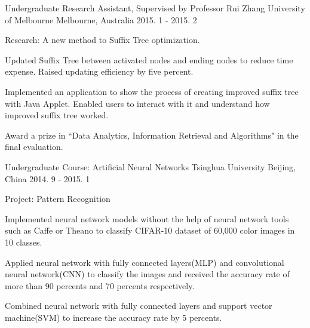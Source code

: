 \begin{cventries}
  \cventry
    {Undergraduate Research Assistant, Supervised by Professor Rui Zhang}
    {University of Melbourne}
    {Melbourne, Australia}
    {2015. 1 - 2015. 2}
    {
      \begin{cvitems}
        \item {Research: A new method to Suffix Tree optimization.}
        \item {Updated Suffix Tree between activated nodes and ending nodes to reduce time expense. Raised updating efficiency by five percent.}
        \item {Implemented an application to show the process of creating improved suffix tree with Java Applet. Enabled users to interact with it and understand how improved suffix tree worked.}
        \item {Award a prize in ``Data Analytics, Information Retrieval and Algorithms" in the final evaluation.}
      \end{cvitems}
    }
   \cventry
    {Undergraduate Course: Artificial Neural Networks}
    {Tsinghua University}
    {Beijing, China}
    {2014. 9 - 2015. 1}
    {
      \begin{cvitems}
        \item{Project: Pattern Recognition}
        \item{Implemented neural network models without the help of neural network tools such as Caffe or Theano to classify CIFAR-10 dataset of 60,000 color images in 10 classes.}
        \item{Applied neural network with fully connected layers(MLP) and convolutional neural network(CNN) to classify the images and received the accuracy rate of more than 90 percents and 70 percents respectively.}
        \item{Combined neural network with fully connected layers and support vector machine(SVM) to increase the accuracy rate by 5 percents.}
      \end{cvitems}
    }
\end{cventries}
